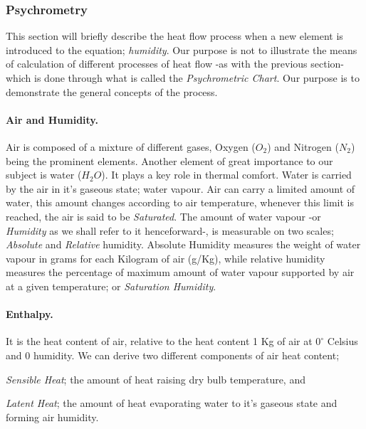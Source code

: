 \subsubsection{Psychrometry}
This section will briefly describe the heat flow process when a new element is introduced to the
equation; \emph{humidity}. Our purpose is not to illustrate the means of calculation of different
processes of heat flow -as with the previous section- which is done through what is called the
\emph{Psychrometric Chart}. Our purpose is to demonstrate the general concepts of the process.
\paragraph{Air and Humidity.} Air is composed of a mixture of different gases, Oxygen ($O_2$) and
Nitrogen ($N_2$) being the prominent elements. Another element of great importance to our subject is
water ($H_2O$). It plays a key role in thermal comfort. Water is carried by the air in it's gaseous
state; water vapour. Air can carry a limited amount of water, this amount changes according to air
temperature, whenever this limit is reached, the air is said to be \emph{Saturated}. The amount of water vapour -or
\emph{Humidity} as we shall refer to it henceforward-, is measurable on two scales;
\emph{Absolute} and \emph{Relative} humidity. Absolute Humidity measures the weight of water vapour
in grams for each Kilogram of air (g/Kg), while relative humidity measures the percentage of maximum
amount of water vapour supported by air at a given temperature; or \emph{Saturation Humidity}.

\paragraph{Enthalpy.}It is the heat content of air, relative to the heat content 1 Kg of air at
$0^\circ$ Celsius and 0 humidity. We can derive two different components of air heat content; 
\begin{inparaenum}
\item \emph{Sensible Heat}; the amount of heat raising dry bulb temperature, and
\item \emph{Latent Heat}; the amount of heat evaporating water to it's gaseous state and forming
air humidity.
\end{inparaenum}

